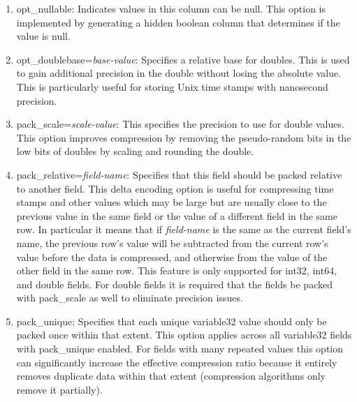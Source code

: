 \begin{enumerate}

\item opt\_nullable: Indicates values in this column can be null.
This option is
implemented by generating a hidden boolean column that determines if
the value is null.

\item opt\_doublebase={\it base-value}: Specifies a relative base for
doubles.  This is used to gain additional precision in the double
without losing the absolute value.  
This is particularly useful for storing Unix time stamps with nanosecond
precision.

\item pack\_scale={\it scale-value}: This specifies the precision to use for
double values.
This option improves compression by removing the pseudo-random bits in the low 
bits of doubles by scaling and rounding the double.  

\item pack\_relative={\it field-name}: Specifies that this field
should be packed relative to another field.  This delta encoding
option is useful for compressing time stamps and other values which
may be large but are usually close to the previous value in the same
field or the value of a different field in the same row.  In
particular it means that if {\it field-name} is the same as the
current field's name, the previous row's value will be subtracted from
the current row's value before the data is compressed, and otherwise
from the value of the other field in the same row.  This feature is
only supported for int32, int64, and double fields.  For double fields
it is required that the fields be packed with pack\_scale as well to
eliminate precision issues.

\item pack\_unique: Specifies that each unique variable32 value
should only be packed once within that extent.  This option applies across all variable32
fields with pack\_unique enabled.  For fields with many repeated
values this option can significantly increase the effective
compression ratio because it entirely removes duplicate data within that extent
(compression algorithms only remove it partially).

\end{enumerate}

